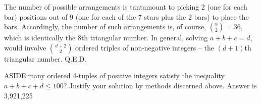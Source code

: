 The number of possible arrangements is tantamount to picking 2 (one for each bar) positions out of 9 (one for each of the 7 stars plus the 2 bars) to place the bars. Accordingly, the number of such arrangements is, of course, \(\binom{9}{2} = 36\), which is identically the 8th triangular number. In general, solving \(a + b + c = d\), would involve \(\binom{d+2}{2}\) ordered triples of non-negative integers – the \((d + 1)\)th triangular number. Q.E.D.

ASIDE:\@How many ordered 4-tuples of positive integers satisfy the inequality \(a + b + c + d \leq 100\)? Justify your solution by methods discerned above. {\scriptsize Answer is 3,921,225}
